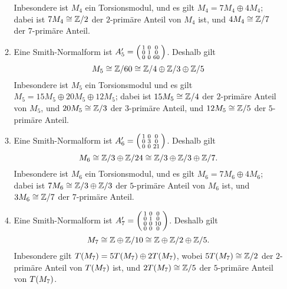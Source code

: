 \begin{solution}
\begin{enumerate}
\begin{enumerate}
\[          \]
          Inbesondere ist $M_4$ ein Torsionsmodul, und es gilt $M_4 = 7 M_4 \oplus 4 M_4$;
          dabei ist $7 M_4 \cong \mathbb{Z}/2$ der $2$-primäre Anteil von $M_4$ ist, und $4 M_4 \cong \mathbb{Z}/7$ der $7$-primäre Anteil.
        \item
          Eine Smith-Normalform ist $A_5' = \begin{psmallmatrix} 1 & 0 & 0 \\ 0 & 1 & 0 \\ 0 & 0 & 60 \end{psmallmatrix}$.
          Deshalb gilt
          \[
                  M_5
            \cong \mathbb{Z}/60
            \cong \mathbb{Z}/4 \oplus \mathbb{Z}/3 \oplus \mathbb{Z}/5
          \]
          Inbesondere ist $M_5$ ein Torsionsmodul und es gilt $M_5 = 15 M_5 \oplus 20 M_5 \oplus 12 M_5$;
          dabei ist $15 M_5\cong \mathbb{Z}/4$ der $2$-primäre Anteil von $M_5$, und $20 M_5 \cong \mathbb{Z}/3$ der $3$-primäre Anteil, und $12 M_5 \cong \mathbb{Z}/5$ der $5$-primäre Anteil.
        \item
          Eine Smith-Normalform ist $A_6' = \begin{psmallmatrix} 1 & 0 & 0 \\ 0 & 3 & 0 \\ 0 & 0 & 21 \end{psmallmatrix}$.
          Deshalb gilt
          \[
                  M_6
            \cong \mathbb{Z}/3 \oplus \mathbb{Z}/24
            \cong \mathbb{Z}/3 \oplus \mathbb{Z}/3 \oplus \mathbb{Z}/7.
          \]
          Inbesondere ist $M_6$ ein Torsionsmodul, und es gilt $M_6 = 7 M_6 \oplus 4 M_6$;
          dabei ist $7 M_6 \cong \mathbb{Z}/3 \oplus \mathbb{Z}/3$ der $5$-primäre Anteil von $M_6$ ist, und $3 M_6 \cong \mathbb{Z}/7$ der $7$-primäre Anteil.
        \item
          Eine Smith-Normalform ist $A_7' = \begin{psmallmatrix} 1 & 0 & 0 \\ 0 & 1 & 0 \\ 0 & 0 & 10 \\ 0 & 0 & 0 \end{psmallmatrix}$.
          Deshalb gilt
          \[
                  M_7
            \cong \mathbb{Z} \oplus \mathbb{Z}/10
            \cong \mathbb{Z} \oplus \mathbb{Z}/2 \oplus \mathbb{Z}/5.
          \]
          Inbesondere gilt $T(M_7) = 5 T(M_7) \oplus 2 T(M_7)$, wobei $5 T(M_7) \cong \mathbb{Z}/2$ der $2$-primäre Anteil von $T(M_7)$ ist, und $2 T(M_7) \cong \mathbb{Z}/5$ der $5$-primäre Anteil von $T(M_7)$.

\end{enumerate}
\end{enumerate}
\end{solution}
